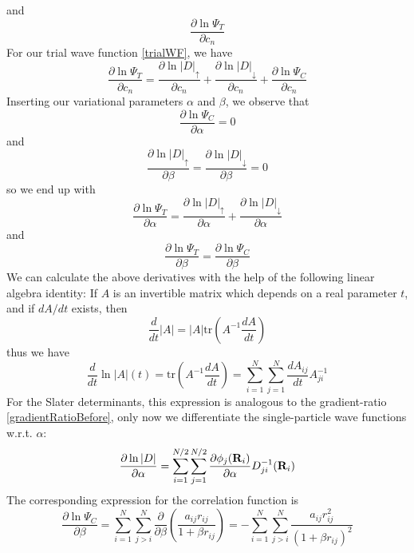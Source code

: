 \documentclass[english, a4paper]{article}
\begin{document}
and 
\begin{equation}
\frac{\partial \ln{\Psi_T}}{\partial c_n}
\label{sampleOptimize2}
\end{equation}
For our trial wave function \eqref{trialWF}, we have
\begin{equation}
 \frac{\partial\ln{\Psi_T}}{\partial c_n} = \frac{\partial\ln{|D|_\uparrow}}{\partial c_n} + 
 \frac{\partial\ln{|D|_\downarrow}}{\partial c_n} + \frac{\partial\ln{\Psi_C}}{\partial c_n}
\end{equation}
Inserting our variational parameters $\alpha$ and $\beta$, we observe that
\begin{equation}
 \frac{\partial\ln{\Psi_C}}{\partial \alpha} = 0
\end{equation}
and 
\begin{equation}
 \frac{\partial\ln{|D|_\uparrow}}{\partial \beta} = \frac{\partial\ln{|D|_\downarrow}}{\partial \beta} = 0
\end{equation}
so we end up with
\begin{equation}
 \frac{\partial\ln{\Psi_T}}{\partial \alpha} = \frac{\partial\ln{|D|_\uparrow}}{\partial \alpha} + 
 \frac{\partial\ln{|D|_\downarrow}}{\partial \alpha}
\end{equation}
and 
\begin{equation}
\frac{\partial\ln{\Psi_T}}{\partial \beta} = \frac{\partial\ln{\Psi_C}}{\partial \beta}
\end{equation}
We can calculate the above derivatives with the help of the following linear algebra identity:
If $A$ is an invertible matrix which depends on a real parameter $t$, and if $dA/dt$ exists, then
\begin{equation}
 \frac{d}{dt}|A| = |A|\textrm{tr}\left(A^{-1}\frac{dA}{dt}\right)
\end{equation}
thus we have
\begin{equation}
 \frac{d}{dt}\ln{|A|(t)} = \textrm{tr}\left(A^{-1}\frac{dA}{dt}\right) = 
 \sum_{i=1}^N\sum_{j=1}^N\frac{dA_{ij}}{dt}A_{ji}^{-1}
\end{equation}
For the Slater determinants, this expression is analogous to the gradient-ratio \eqref{gradientRatioBefore},
only now we differentiate the single-particle wave functions w.r.t. $\alpha$:
\begin{equation}
 \frac{\partial\ln{|D|}}{\partial \alpha} = 
 \sum_{i=1}^{N/2} \sum_{j=1}^{N/2} \frac{\partial \phi_j({\bf R}_i)}{\partial \alpha} D_{ji}^{-1}({\bf R}_i)
\end{equation}
The corresponding expression for the correlation function is
\begin{equation}
 \frac{\partial\ln{\Psi_C}}{\partial \beta} = 
 \sum_{i=1}^N\sum_{j>i}^N \frac{\partial}{\partial\beta}
 \left(\frac{a_{ij}r_{ij}}{1 + \beta r_{ij}}\right) = 
 -\sum_{i=1}^N\sum_{j>i}^N \frac{a_{ij}r_{ij}^2}{(1 + \beta r_{ij})^2}
\end{equation}
\end{document}
